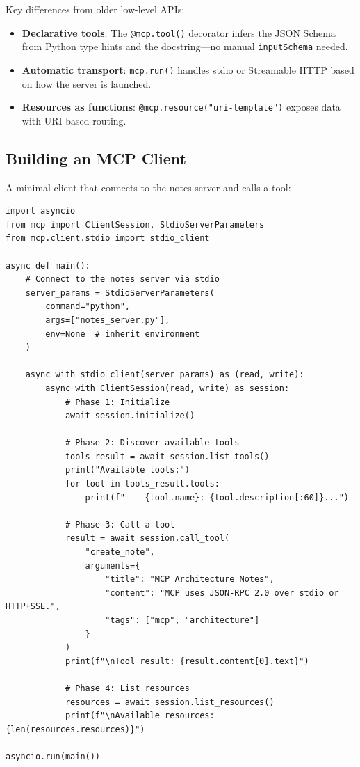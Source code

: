 Key differences from older low-level APIs:

\begin{itemize}
  \item \textbf{Declarative tools}: The \texttt{@mcp.tool()} decorator infers the JSON Schema from Python type hints and the docstring---no manual \texttt{inputSchema} needed.
  \item \textbf{Automatic transport}: \texttt{mcp.run()} handles stdio or Streamable HTTP based on how the server is launched.
  \item \textbf{Resources as functions}: \texttt{@mcp.resource("uri-template")} exposes data with URI-based routing.
\end{itemize}

\subsection{Building an MCP Client}
\label{building-an-mcp-client}

A minimal client that connects to the notes server and calls a tool:

\begin{lstlisting}[style=pythonstyle, caption={MCP Client: Connecting and Calling Tools}]
import asyncio
from mcp import ClientSession, StdioServerParameters
from mcp.client.stdio import stdio_client

async def main():
    # Connect to the notes server via stdio
    server_params = StdioServerParameters(
        command="python",
        args=["notes_server.py"],
        env=None  # inherit environment
    )

    async with stdio_client(server_params) as (read, write):
        async with ClientSession(read, write) as session:
            # Phase 1: Initialize
            await session.initialize()

            # Phase 2: Discover available tools
            tools_result = await session.list_tools()
            print("Available tools:")
            for tool in tools_result.tools:
                print(f"  - {tool.name}: {tool.description[:60]}...")

            # Phase 3: Call a tool
            result = await session.call_tool(
                "create_note",
                arguments={
                    "title": "MCP Architecture Notes",
                    "content": "MCP uses JSON-RPC 2.0 over stdio or HTTP+SSE.",
                    "tags": ["mcp", "architecture"]
                }
            )
            print(f"\nTool result: {result.content[0].text}")

            # Phase 4: List resources
            resources = await session.list_resources()
            print(f"\nAvailable resources: {len(resources.resources)}")

asyncio.run(main())
\end{lstlisting}

